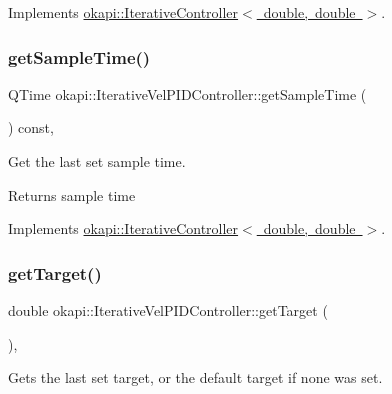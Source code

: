 Implements \mbox{\hyperlink{classokapi_1_1IterativeController_a83e0aac640804974f0e06936b9f7898a}{okapi\+::\+Iterative\+Controller$<$ double, double $>$}}.

\mbox{\label{classokapi_1_1IterativeVelPIDController_aa786680075677c2f43619d48cad0e154}} 
\subsubsection{\texorpdfstring{getSampleTime()}{getSampleTime()}}
{\footnotesize\ttfamily Q\+Time okapi\+::\+Iterative\+Vel\+P\+I\+D\+Controller\+::get\+Sample\+Time (\begin{DoxyParamCaption}{ }\end{DoxyParamCaption}) const\hspace{0.3cm}{\ttfamily [override]}, {\ttfamily [virtual]}}

Get the last set sample time.

\begin{DoxyReturn}{Returns}
sample time 
\end{DoxyReturn}


Implements \mbox{\hyperlink{classokapi_1_1IterativeController_a48cd86626af7036db4f36b4124df4f98}{okapi\+::\+Iterative\+Controller$<$ double, double $>$}}.

\mbox{\label{classokapi_1_1IterativeVelPIDController_a5f2bbad6e916345f8a3abf762609321c}} 
\subsubsection{\texorpdfstring{getTarget()}{getTarget()}}
{\footnotesize\ttfamily double okapi\+::\+Iterative\+Vel\+P\+I\+D\+Controller\+::get\+Target (\begin{DoxyParamCaption}{ }\end{DoxyParamCaption})\hspace{0.3cm}{\ttfamily [override]}, {\ttfamily [virtual]}}

Gets the last set target, or the default target if none was set.

